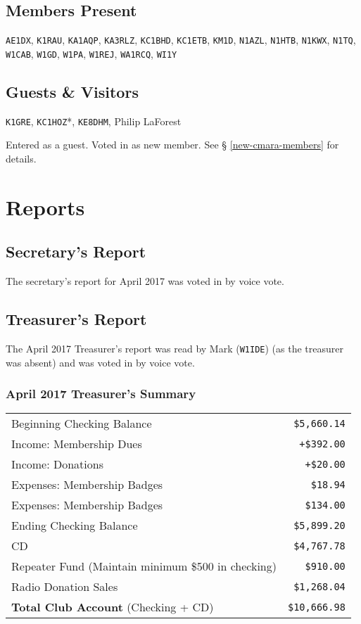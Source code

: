 \documentclass[10pt,letterpaper]{article}
\begin{document}
\subsection{Members Present}

\texttt{AE1DX},
\texttt{K1RAU},
\texttt{KA1AQP},
\texttt{KA3RLZ},
\texttt{KC1BHD},
\texttt{KC1ETB},
\texttt{KM1D},
\texttt{N1AZL},
\texttt{N1HTB},
\texttt{N1KWX},
\texttt{N1TQ},
\texttt{W1CAB},
\texttt{W1GD},
\texttt{W1PA},
\texttt{W1REJ},
\texttt{WA1RCQ},
\texttt{WI1Y}

\subsection{Guests \& Visitors}
\texttt{K1GRE},
\texttt{KC1HOZ}*,
\texttt{KE8DHM},
Philip LaForest

\noindent
\textasteriskcentered{} Entered as a guest. Voted in as new member. See \S{} \ref{new-cmara-members} for details.

\section{Reports}

\subsection{Secretary's Report}
The secretary's report for April 2017 was voted in by voice vote.

\newpage
\subsection{Treasurer's Report}
The April 2017 Treasurer's report was read by Mark (\texttt{W1IDE}) (as the treasurer was absent) and was voted in by voice vote.

\subsubsection{April 2017 Treasurer's Summary}
\noindent
\begin{tabular}{|l|r|}
  \hline
  Beginning Checking Balance & \texttt{\$5,660.14} \\
  Income: Membership Dues & \texttt{+\$392.00} \\
  Income: Donations & \texttt{+\$20.00} \\
  Expenses: Membership Badges & \texttt{\$18.94} \\
  Expenses: Membership Badges & \texttt{\$134.00} \\
  Ending Checking Balance & \texttt{\$5,899.20} \\
  \hline
  \hline
  CD & \texttt{\$4,767.78} \\
  \hline
  \hline
  Repeater Fund (Maintain minimum \$500 in checking) & \texttt{\$910.00} \\
  \hline
  \hline
  Radio Donation Sales & \texttt{\$1,268.04} \\
  \hline
  \hline
  \textbf{Total Club Account} (Checking + CD) & \texttt{\$10,666.98} \\
  \hline
\end{tabular}
\end{document}
